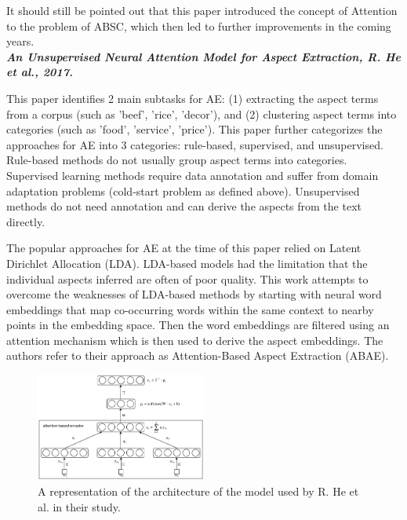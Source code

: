 \documentclass[conference]{IEEEtran}
\begin{document}
It should still be pointed out that this paper introduced the concept of Attention to the problem of ABSC, which then led to further improvements in the coming years.\\

\textit{\textbf{An Unsupervised Neural Attention Model for Aspect Extraction, R. He et al., 2017.}}

This paper identifies 2 main subtasks for AE: (1) extracting the aspect terms from a corpus (such as 'beef', 'rice', 'decor'), and (2) clustering aspect terms into categories (such as 'food', 'service', 'price'). This paper further categorizes the approaches for AE into 3 categories: rule-based, supervised, and unsupervised. Rule-based methods do not usually group aspect terms into categories. Supervised learning methods require data annotation and suffer from domain adaptation problems (cold-start problem as defined above). Unsupervised methods do not need annotation and can derive the aspects from the text directly.

The popular approaches for AE at the time of this paper relied on Latent Dirichlet Allocation (LDA). LDA-based models had the limitation that the individual aspects inferred are often of poor quality. This work attempts to overcome the weaknesses of LDA-based methods by starting with neural word embeddings that map co-occurring words within the same context to nearby points in the embedding space. Then the word embeddings are filtered using an attention mechanism which is then used to derive the aspect embeddings. The authors refer to their approach as Attention-Based Aspect Extraction (ABAE).

\begin{figure}[htbp]
\centerline{\includegraphics[keepaspectratio, width=0.5\textwidth]{pics/8.png}}
\caption{A representation of the architecture of the model used by R. He et al. in their study.}
\label{fig}
\end{figure}
\end{document}
